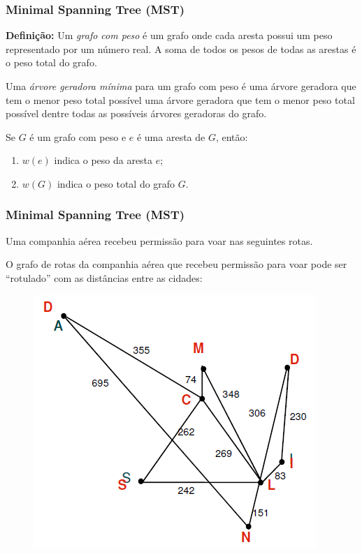 \documentclass[hyperref={pdfpagelabels=false}]{beamer}
\begin{document}
\begin{frame}
\frametitle{Minimal Spanning Tree (MST)}
{\bf Definição:} Um \emph{grafo com peso} é um grafo onde cada aresta possui um peso representado por um número real. A soma de todos os pesos de todas as arestas é o peso total do grafo.

Uma \emph{árvore geradora mínima} para um grafo com peso é uma árvore geradora que tem o menor peso total possível uma árvore geradora que tem o menor peso total possível dentre todas as possíveis árvores geradoras do grafo.

\pause

Se $G$ é um grafo com peso e $e$ é uma aresta de $G$, então:
\begin{enumerate}
	\item $w(e)$ indica o peso da aresta $e$;
	\item $w(G)$ indica o peso total do grafo $G$.
\end{enumerate}

\end{frame}


\begin{frame}
\frametitle{Minimal Spanning Tree (MST)}

Uma companhia aérea recebeu permissão para voar nas seguintes rotas.

O grafo de rotas da companhia aérea que recebeu permissão para voar pode ser “rotulado” com as distâncias entre as cidades:

\begin{figure}[!h]
	\centering
	\includegraphics[scale=0.4]{08}
	\label{08}
\end{figure}


\end{frame}
\end{document}
